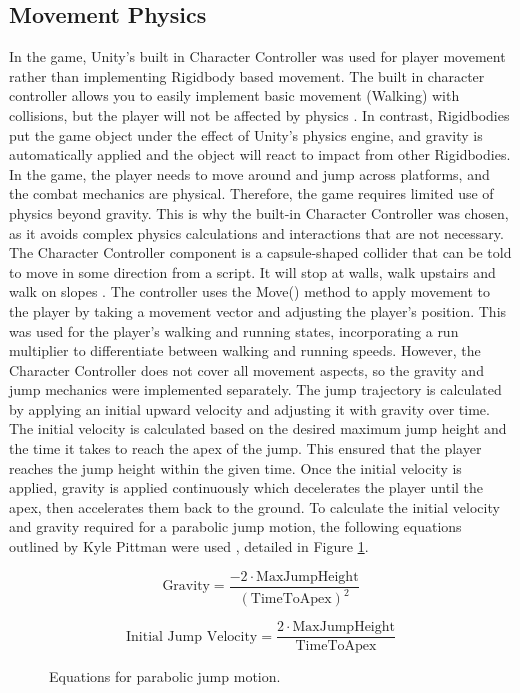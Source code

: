\documentclass[10pt]{final_report}
\begin{document}
\subsection{Movement Physics}\label{physics}
In the game, Unity's built in Character Controller was used for player movement rather than implementing Rigidbody based movement. The built in character controller allows you to easily implement basic movement (Walking) with collisions, but the player will not be affected by physics \cite{unity2024_charactercontroller}. In contrast, Rigidbodies put the game object under the effect of Unity's physics engine, and gravity is automatically applied and the object will react to impact from other Rigidbodies. In the game, the player needs to move around and jump across platforms, and the combat mechanics are physical. Therefore, the game requires limited use of physics beyond gravity.  This is why the built-in Character Controller was chosen, as it avoids complex physics calculations and interactions that are not necessary. \newline
The Character Controller component is a capsule-shaped collider that can be told to move in some direction from a script. It will stop at walls, walk upstairs and walk on slopes \cite{unity2024_charactercontroller_reference}. The controller uses the Move() method to apply movement to the player by taking a movement vector and adjusting the player's position. This was used for the player's walking and running states, incorporating a run multiplier to differentiate between walking and running speeds. However, the Character Controller does not cover all movement aspects, so the gravity and jump mechanics were implemented separately.  \newline
The jump trajectory is calculated by applying an initial upward velocity and adjusting it with gravity over time. The initial velocity is calculated based on the desired maximum jump height and the time it takes to reach the apex of the jump. This ensured that the player reaches the jump height within the given time. Once the initial velocity is applied, gravity is applied continuously which decelerates the player until the apex, then accelerates them back to the ground. To calculate the initial velocity and gravity required for a parabolic jump motion, the following equations outlined by Kyle Pittman were used \cite{pittman2016_jump}, detailed in Figure \ref{equations}.
\begin{figure}[H]
	\begin{equation}
	\text{Gravity} = \frac{-2 \cdot \text{MaxJumpHeight}}{(\text{TimeToApex})^2}
	\end{equation}

	\begin{equation}
	\text{Initial Jump Velocity} = \frac{2 \cdot \text{MaxJumpHeight}}{\text{TimeToApex}}
	\end{equation}
	\caption{Equations for parabolic jump motion.}
	\label{equations}
\end{figure}
\end{document}
